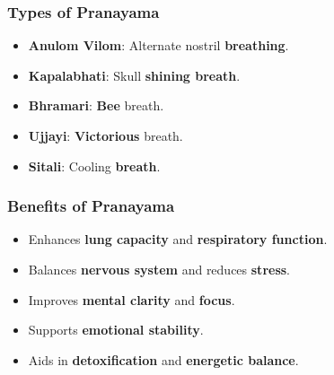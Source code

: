 \begin{frame}[fragile]\frametitle{Types of Pranayama}

      \begin{itemize}
        \item \textbf{Anulom Vilom}: Alternate nostril \textbf{breathing}.
        \item \textbf{Kapalabhati}: Skull \textbf{shining breath}.
        \item \textbf{Bhramari}: \textbf{Bee} breath.
        \item \textbf{Ujjayi}: \textbf{Victorious} breath.
        \item \textbf{Sitali}: Cooling \textbf{breath}.
      \end{itemize}

\end{frame}

\begin{frame}[fragile]\frametitle{Benefits of Pranayama}
      \begin{itemize}
        \item Enhances \textbf{lung capacity} and \textbf{respiratory function}.
        \item Balances \textbf{nervous system} and reduces \textbf{stress}.
        \item Improves \textbf{mental clarity} and \textbf{focus}.
        \item Supports \textbf{emotional stability}.
        \item Aids in \textbf{detoxification} and \textbf{energetic balance}.
      \end{itemize}

\end{frame}

